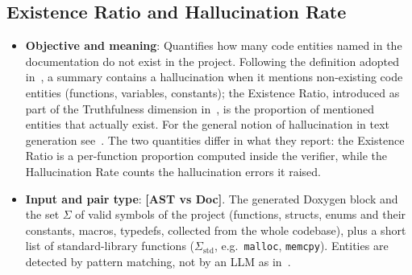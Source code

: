 
\subsection{Existence Ratio and Hallucination Rate}
\label{sec:m-hallucination}
\begin{itemize}[leftmargin=*, label=\textbullet]
	\item \textbf{Objective and meaning}: Quantifies how many code entities named in the documentation
	do not exist in the project. Following the definition adopted in~\cite{lomshakov_proconsul_2024},
	a summary contains a hallucination when it mentions non-existing code entities (functions,
	variables, constants); the Existence Ratio, introduced as part of the Truthfulness dimension
	in~\cite{yang_docagent_2025}, is the proportion of mentioned entities that actually exist. For the
	general notion of hallucination in text generation see~\cite{ji_survey_2023}. The two quantities
	differ in what they report: the Existence Ratio is a per-function proportion computed inside the
	verifier, while the Hallucination Rate counts the hallucination errors it raised.

	\item \textbf{Input and pair type}: \textbf{[AST vs Doc]}. The generated Doxygen block and the set
	$\Sigma$ of valid symbols of the project (functions, structs, enums and their constants, macros,
	typedefs, collected from the whole codebase), plus a short list of standard-library functions
	($\Sigma_{\mathrm{std}}$, e.g.\ \texttt{malloc}, \texttt{memcpy}). Entities are detected by pattern
	matching, not by an LLM as in~\cite{yang_docagent_2025}.


\end{itemize}
